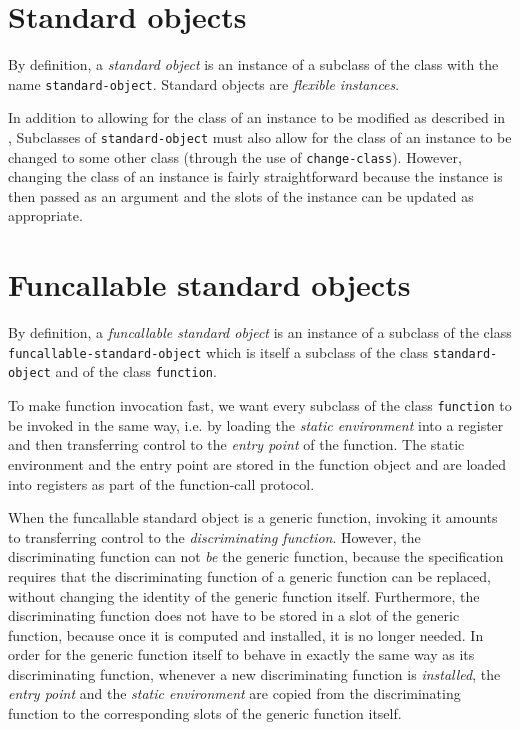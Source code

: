 \section{Standard objects}
\label{sec-data-representation-standard-objects}

By definition, a \emph{standard object} is an instance of a subclass
of the class with the name \texttt{standard-object}.  Standard objects
are \emph{flexible instances}.

In addition to allowing for the class of an instance to be modified as
described in ,
Subclasses of \texttt{standard-object} must also allow for the class
of an instance to be changed to some other class (through the use of
\texttt{change-class}).  However, changing the class of an instance is
fairly straightforward because the instance is then passed as an
argument and the slots of the instance can be updated as appropriate.

\section{Funcallable standard objects}
\label{sec-data-representation-funcallable-standard-objects}

By definition, a \emph{funcallable standard object} is an instance of
a subclass of the class \texttt{funcallable-standard-object} which is
itself a subclass of the class \texttt{standard-object}
 and of the class
\texttt{function}. 


To make function invocation fast, we want every subclass of the class
\texttt{function} to be invoked in the same way, i.e. by loading the
\emph{static environment} into a register and then transferring
control to the \emph{entry point} of the function. The static
environment and the entry point are stored in the function object
and are loaded into registers as part of the function-call protocol.

When the funcallable standard object is a generic function, invoking
it amounts to transferring control to the \emph{discriminating
  function}.  However, the discriminating function can not \emph{be}
the generic function, because the \clos{} specification requires that
the discriminating function of a generic function can be replaced,
without changing the identity of the generic function itself.
Furthermore, the discriminating function does not have to be stored in
a slot of the generic function, because once it is computed and
installed, it is no longer needed.  In order for the generic function
itself to behave in exactly the same way as its discriminating
function, whenever a new discriminating function is \emph{installed},
the \emph{entry point} and the \emph{static environment} are copied
from the discriminating function to the corresponding slots of the
generic function itself.

